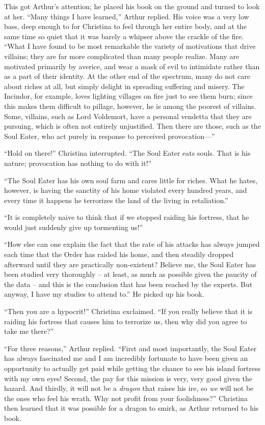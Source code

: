 \documentclass[showtrims,b6paper,draft,10pt]{memoir}
\begin{document}
This got Arthur's attention;  he placed his book on the ground and turned to look at her.  ``Many things I have learned,'' Arthur replied.  His voice was a very low bass, deep enough to for Christina to feel through her entire body, and at the same time so quiet that it was barely a whipser above the crackle of the fire.  ``What I have found to be most remarkable the variety of motivations that drive villains;  they are far more complicated than many people realize.  Many are motivated primarily by averice, and wear a mask of evil to intimidate rather than as a part of their identity.  At the other end of the spectrum, many do not care about riches at all, but simply delight in spreading suffering and misery.  The Incindor, for example, loves lighting villages on fire just to see them burn;  since this makes them difficult to pillage, however, he is among the poorest of villains.  Some, villains, such as Lord Voldemort, have a personal vendetta that they are pursuing, which is often not entirely unjustified.  Then there are those, such as the Soul Eater, who act purely in response to perceived provocation---''

``Hold on there!'' Christina interrupted.  ``The Soul Eater eats souls.  That is his nature;  provocation has nothing to do with it!''

``The Soul Eater has his own soul farm and cares little for riches.  What he hates, however, is having the sanctity of his home violated every hundred years, and every time it happens he terrorizes the land of the living in retaliation.''

``It is completely naive to think that if we stopped raiding his fortress, that he would just suddenly give up tormenting us!''

``How else can one explain the fact that the rate of his attacks has always jumped each time that the Order has raided his home, and then steadily dropped afterward until they are practically non-existent?  Believe me, the Soul Eater has been studied very thoroughly -- at least, as much as possible given the paucity of the data -- and this is the conclusion that has been reached by the experts.  But anyway, I have my studies to attend to.''  He picked up his book.

``Then you are a hypocrit!'' Christina exclaimed.  ``If you really believe that it is raiding his fortress that causes him to terrorize us, then why did you agree to take me there?''

``For three reasons,'' Arthur replied.  ``First and most importantly, the Soul Eater has always fascinated me and I am incredibly fortunate to have been given an opportunity to actually get paid while getting the chance to see his island fortress with my own eyes!  Second, the pay for this mission is very, very good given the hazard.  And thirdly, it will not be a \emph{dragon} that raises his ire, so \emph{we} will not be the ones who feel his wrath.  Why not profit from your foolishness?''  Christina then learned that it was possible for a dragon to smirk, as Arthur returned to his book.
\end{document}
